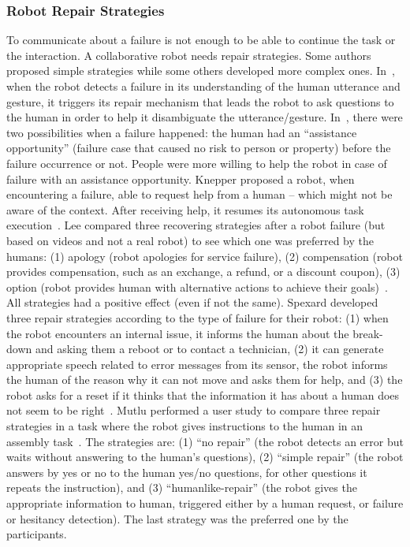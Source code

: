 \documentclass[a4paper,11pt,twoside]{StyleThese}
\begin{document}
\subsubsection{Robot Repair Strategies}
To communicate about a failure is not enough to be able to continue the task or the interaction. A collaborative robot needs repair strategies. Some authors proposed simple strategies while some others developed more complex ones. In~\cite{li_2006_computational}, when the robot detects a failure in its understanding of the human utterance and gesture, it triggers its repair mechanism that leads the robot to ask questions to the human in order to help it disambiguate the utterance/gesture. In~\cite{morales_2019_interaction}, there were two possibilities when a failure happened: the human had an ``assistance opportunity'' (\ie failure case that caused no risk to person or property) before the failure occurrence or not. People were more willing to help the robot in case of failure with an assistance opportunity. Knepper \etal{} proposed a robot, when encountering a failure, able to request help from a human -- which might not be aware of the context. After receiving help, it resumes its autonomous task execution~\cite{knepper_2015_recovering}. Lee \etal{} compared three recovering strategies after a robot failure (but based on videos and not a real robot) to see which one was preferred by the humans: (1) apology (\ie robot apologies for service failure), (2) compensation (\ie robot provides compensation, such as an exchange, a refund, or a discount coupon), (3) option (\ie robot provides human with alternative actions to achieve their goals)~\cite{lee_2010_gracefully}. All strategies had a positive effect (even if not the same). Spexard \etal{} developed three repair strategies according to the type of failure for their robot: (1) when the robot encounters an internal issue, it informs the human about the break-down and asking them a reboot or to contact a technician, (2) it can generate appropriate speech related to error messages from its sensor, \eg the robot informs the human of the reason why it can not move and asks them for help, and (3) the robot asks for a reset if it thinks that the information it has about a human does not seem to be right~\cite{spexard_2008_oops}. Mutlu \etal{} performed a user study to compare three repair strategies in a task where the robot gives instructions to the human in an assembly task~\cite{mutlu_2013_coordination}. The strategies are: (1) ``no repair'' (\ie the robot detects an error but waits without answering to the human's questions), (2) ``simple repair'' (\ie the robot answers by yes or no to the human yes/no questions, for other questions it repeats the instruction), and (3) ``humanlike-repair'' (\ie the robot gives the appropriate information to human, triggered either by a human request, or failure or hesitancy detection). The last strategy was the preferred one by the participants.
\end{document}
